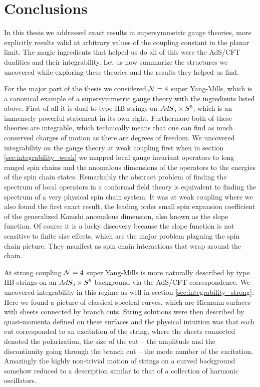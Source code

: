 
\section{Conclusions}

In this thesis we addressed exact results in supersymmetric gauge theories, more explicitly results valid at arbitrary values of the coupling constant in the planar limit.
The magic ingredients that helped us do all of this were the AdS/CFT dualities and their integrability.
Let us now summarize the structures we uncovered while exploring these theories and the results they helped us find.

For the major part of the thesis we considered $\mathcal{N}=4$ super Yang-Mills, which is a canonical example of a supersymmetric gauge theory with the ingredients listed above.
First of all it is dual to type IIB strings on $AdS_5 \times S^5$, which is an immensely powerful statement in its own right.
Furthermore both of these theories are integrable, which technically means that one can find as much conserved charges of motion as there are degrees of freedom.
We uncovered integrability on the gauge theory at weak coupling first when in section \ref{sec:integrability_weak} we mapped local gauge invariant operators to long ranged spin chains and the anomalous dimensions of the operators to the energies of the spin chain states.
Remarkably the abstract problem of finding the spectrum of local operators in a conformal field theory is equivalent to finding the spectrum of a very physical spin chain system.
It was at weak coupling where we also found the first exact result, the leading order small spin expansion coefficient of the generalized Konishi anomalous dimension, also known as the slope function. 
Of course it is a lucky discovery because the slope function is not sensitive to finite size effects, which are the major problem plaguing the spin chain picture.
They manifest as spin chain interactions that wrap around the chain.

At strong coupling $\mathcal{N}=4$ super Yang-Mills is more naturally described by type IIB strings on an $AdS_5 \times S^5$ background via the AdS/CFT correspondence. 
We uncovered integrability in this regime as well in section \ref{sec:integrability_strong}.
Here we found a picture of classical spectral curves, which are Riemann surfaces with sheets connected by branch cuts. 
String solutions were then described by quasi-momenta defined on these surfaces and the physical intuition was that each cut corresponded to an excitation of the string, where the sheets connected denoted the polarization, the size of the cut -- the amplitude and the discontinuity going through the branch cut -- the mode number of the excitation.
Amazingly the highly non-trivial motion of strings on a curved background somehow reduced to a description similar to that of a collection of harmonic oscillators.

